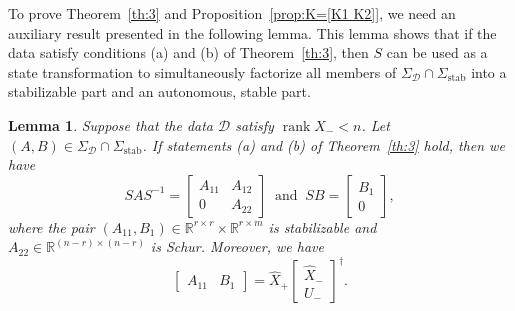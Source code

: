 \documentclass[9pt,shortpaper,twoside,web]{ieeecolor}
\DeclareMathOperator{\rank}{rank}
\newtheorem{lemma}[theorem]{Lemma}
\begin{document}

To prove Theorem~\ref{th:3} and Proposition~\ref{prop:K=[K1 K2]}, we need an auxiliary result presented in the following lemma. %
This lemma shows that if the data satisfy conditions (a) and (b) of Theorem~\ref{th:3}, then $S$ can be used as a state transformation to simultaneously factorize all members of $\Sigma_\mathcal{D}\cap\Sigma_\text{stab}$ into a stabilizable part and an autonomous, stable part. %

\begin{lemma}
\label{lem:partition_proof}
Suppose that the data $\mathcal{D}$ satisfy $\rank X_-<n$. Let $(A,B)\in\Sigma_\mathcal{D}\cap\Sigma_\text{stab}$. If statements (a) and (b) of Theorem~\ref{th:3} hold, then we have
\begin{equation}
\label{eq:partition_proof}
SAS^{-1}=\begin{bmatrix}
A_{11} & A_{12} \\
0 & A_{22}
\end{bmatrix}\ \text{ and }\ SB=\begin{bmatrix}
B_1 \\ 0
\end{bmatrix},
\end{equation}
where the pair $(A_{11},B_1)\in\mathbb{R}^{r\times r}\times\mathbb{R}^{r\times m}$ is stabilizable and \mbox{$A_{22}\in\mathbb{R}^{(n-r)\times (n-r)}$} is Schur. Moreover, we have
\begin{equation}
\label{eq:partition_formula_A_11_B1}
\begin{bmatrix}
A_{11} & B_1
\end{bmatrix}=\hat{X}_+\begin{bmatrix}
\hat{X}_- \\
U_-
\end{bmatrix}^\dagger. 
\end{equation}
\end{lemma}\vspace{0.25 cm}
\end{document}
